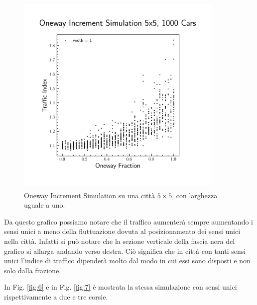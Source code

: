 \documentclass{article}
\begin{document}
        \begin{figure}[H]
            \centering
            \includegraphics[width=10cm, height=10cm]{oneway_increment_1.png}  
            \caption{Oneway Increment Simulation su una città $5 \times 5$, con larghezza uguale a uno.}
            \label{fig:5}
        \end{figure}

        Da questo grafico possiamo notare che il traffico aumenterà sempre aumentando i sensi unici a meno della fluttuazione dovuta
        al posizionamento dei sensi unici nella città. Infatti si può notare che la sezione verticale della fascia nera del grafico si allarga
        andando verso destra. Ciò significa che in città con tanti sensi unici l'indice di traffico dipenderà molto dal modo in cui essi sono disposti
        e non solo dalla frazione.

        In Fig. \ref{fig:6} e in Fig. \ref{fig:7} è mostrata la stessa simulazione con sensi unici rispettivamente a due e tre corsie.
\end{document}
